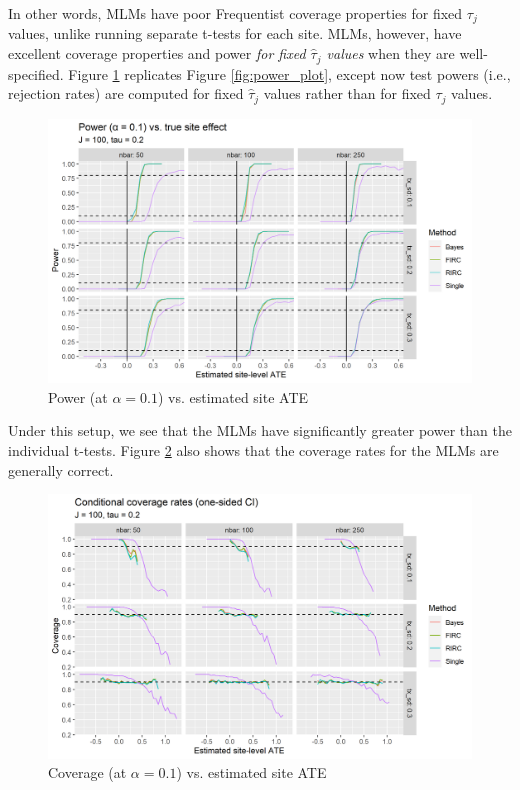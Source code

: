 \documentclass[]{article}
\begin{document}
In other words, MLMs have poor Frequentist coverage properties for fixed $\tau_j$ values, unlike running separate t-tests for each site.
MLMs, however, have excellent coverage properties and power \textit{for fixed $\hat{\tau}_j$ values} when they are well-specified.
Figure \ref{fig:power_plot_cond} replicates Figure \ref{fig:power_plot}, except now test powers (i.e., rejection rates) are computed for fixed $\hat{\tau}_j$ values rather than for fixed $\tau_j$ values.
\begin{figure}[ht]
	\centering
	\includegraphics[width=\textwidth]{cond_power_1sided}
	\caption{Power (at $\alpha = 0.1$) vs. estimated site ATE}
	\label{fig:power_plot_cond}
\end{figure}
Under this setup, we see that the MLMs have significantly greater power than the individual t-tests.
Figure \ref{fig:coverage_plot_cond} also shows that the coverage rates for the MLMs are generally correct.
\begin{figure}[ht]
	\centering
	\includegraphics[width=\textwidth]{writeup/images/cond_coverage_1sided.png}
	\caption{Coverage (at $\alpha = 0.1$) vs. estimated site ATE}
	\label{fig:coverage_plot_cond}
\end{figure}
\end{document}
